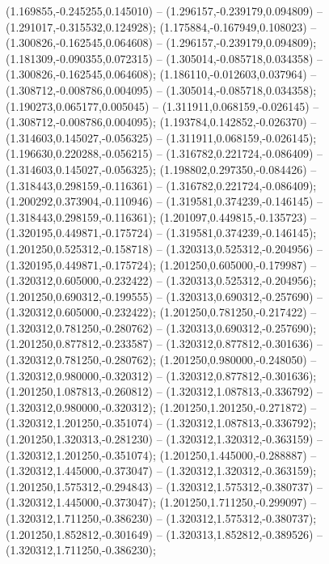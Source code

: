  (1.169855,-0.245255,0.145010) -- (1.296157,-0.239179,0.094809) -- (1.291017,-0.315532,0.124928);
 (1.175884,-0.167949,0.108023) -- (1.300826,-0.162545,0.064608) -- (1.296157,-0.239179,0.094809);
 (1.181309,-0.090355,0.072315) -- (1.305014,-0.085718,0.034358) -- (1.300826,-0.162545,0.064608);
 (1.186110,-0.012603,0.037964) -- (1.308712,-0.008786,0.004095) -- (1.305014,-0.085718,0.034358);
 (1.190273,0.065177,0.005045) -- (1.311911,0.068159,-0.026145) -- (1.308712,-0.008786,0.004095);
 (1.193784,0.142852,-0.026370) -- (1.314603,0.145027,-0.056325) -- (1.311911,0.068159,-0.026145);
 (1.196630,0.220288,-0.056215) -- (1.316782,0.221724,-0.086409) -- (1.314603,0.145027,-0.056325);
 (1.198802,0.297350,-0.084426) -- (1.318443,0.298159,-0.116361) -- (1.316782,0.221724,-0.086409);
 (1.200292,0.373904,-0.110946) -- (1.319581,0.374239,-0.146145) -- (1.318443,0.298159,-0.116361);
 (1.201097,0.449815,-0.135723) -- (1.320195,0.449871,-0.175724) -- (1.319581,0.374239,-0.146145);
 (1.201250,0.525312,-0.158718) -- (1.320313,0.525312,-0.204956) -- (1.320195,0.449871,-0.175724);
 (1.201250,0.605000,-0.179987) -- (1.320312,0.605000,-0.232422) -- (1.320313,0.525312,-0.204956);
 (1.201250,0.690312,-0.199555) -- (1.320313,0.690312,-0.257690) -- (1.320312,0.605000,-0.232422);
 (1.201250,0.781250,-0.217422) -- (1.320312,0.781250,-0.280762) -- (1.320313,0.690312,-0.257690);
 (1.201250,0.877812,-0.233587) -- (1.320312,0.877812,-0.301636) -- (1.320312,0.781250,-0.280762);
 (1.201250,0.980000,-0.248050) -- (1.320312,0.980000,-0.320312) -- (1.320312,0.877812,-0.301636);
 (1.201250,1.087813,-0.260812) -- (1.320312,1.087813,-0.336792) -- (1.320312,0.980000,-0.320312);
 (1.201250,1.201250,-0.271872) -- (1.320312,1.201250,-0.351074) -- (1.320312,1.087813,-0.336792);
 (1.201250,1.320313,-0.281230) -- (1.320312,1.320312,-0.363159) -- (1.320312,1.201250,-0.351074);
 (1.201250,1.445000,-0.288887) -- (1.320312,1.445000,-0.373047) -- (1.320312,1.320312,-0.363159);
 (1.201250,1.575312,-0.294843) -- (1.320312,1.575312,-0.380737) -- (1.320312,1.445000,-0.373047);
 (1.201250,1.711250,-0.299097) -- (1.320312,1.711250,-0.386230) -- (1.320312,1.575312,-0.380737);
 (1.201250,1.852812,-0.301649) -- (1.320313,1.852812,-0.389526) -- (1.320312,1.711250,-0.386230);
